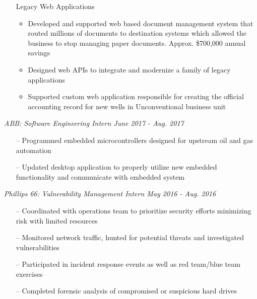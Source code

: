 \documentclass[line,overlapped,9pt]{res}
\begin{document}
\begin{resume}
\begin{itemize}[leftmargin=*]
\begin{itemize}
                   \end{itemize}
                 \item[] Legacy Web Applications 
                   \begin{itemize}
                  \setlength\itemsep{.1em}
                   \item Developed and supported web based document management system that routed millions of documents to destination systems which allowed the business 
                    to stop managing paper documents. Approx. \$700,000 annual savings 
                   \item Designed  web APIs to integrate and modernize a family of legacy applications 
                   \item Supported custom web application responsible for creating the official accounting record for new wells in Unconventional business unit
                   \end{itemize}
                 \end{itemize}
                 {\sl ABB: Software Engineering Intern  \hfill June 2017 - Aug. 2017 }
                 \begin{itemize}  %
                  \setlength\itemsep{.1em}
                 \item[--] Programmed embedded microcontrollers designed for upstream
                   oil and gas automation 
                 \item[--] Updated desktop application to properly utilize new embedded functionality and
                   communicate with embedded system
                 \end{itemize} 
                 {\sl Phillips 66: Vulnerability Management Intern
                   \hfill        May 2016 - Aug. 2016}
                  \begin{itemize} 
                  \setlength\itemsep{.1em}
                  \item [--] Coordinated with operations team to prioritize security efforts minimizing risk with limited resources 
                  \item[--] Monitored network traffic, hunted for potential threats and investigated vulnerabilities  
                  \item[--] Participated in incident response events as well as red team/blue team exercises 
                  \item[--] Completed forensic analysis of compromised or suspicious
                    hard drives

\end{itemize}
\end{resume}
\end{document}
